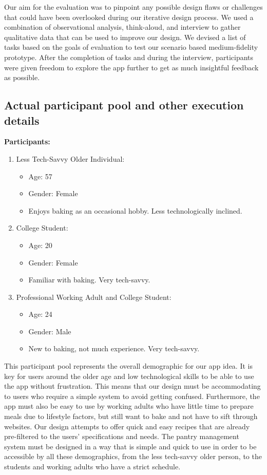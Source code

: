 \documentclass[manuscript, screen, nonacm]{acmart}
\begin{document}
Our aim for the evaluation was to pinpoint any possible design flaws or challenges that could have been overlooked during our iterative design process. We used a combination of observational analysis, think-aloud, and interview to gather qualitative data that can be used to improve our design. We devised a list of tasks based on the goals of evaluation to test our scenario based medium-fidelity prototype. After the completion of tasks and during the interview, participants were given freedom to explore the app further to get as much insightful feedback as possible.
\subsection{Actual participant pool and other execution details}
\textbf{Participants:}
\begin{enumerate}
    \item Less Tech-Savvy Older Individual: \begin{itemize}
        \item Age: 57
        \item Gender: Female
        \item Enjoys baking as an occasional hobby. Less technologically inclined.
    \end{itemize}
    \item College Student:
    \begin{itemize}
        \item Age: 20
        \item Gender: Female
        \item Familiar with baking. Very tech-savvy.
    \end{itemize}    
    \item Professional Working Adult and College Student:
    \begin{itemize}
        \item Age: 24
        \item Gender: Male
        \item New to baking, not much experience. Very tech-savvy.
    \end{itemize} 
\end{enumerate}


This participant pool represents the overall demographic for our app idea. It is key for users around the older age and low technological skills to be able to use the app without frustration. This means that our design must be accommodating to users who require a simple system to avoid getting confused. Furthermore, the app must also be easy to use by working adults who have little time to prepare meals due to lifestyle factors, but still want to bake and not have to sift through websites. Our design attempts to offer quick and easy recipes that are already pre-filtered to the users’ specifications and needs. The pantry management system must be designed in a way that is simple and quick to use in order to be accessible by all these demographics, from the less tech-savvy older person, to the students and working adults who have a strict schedule.
\end{document}
